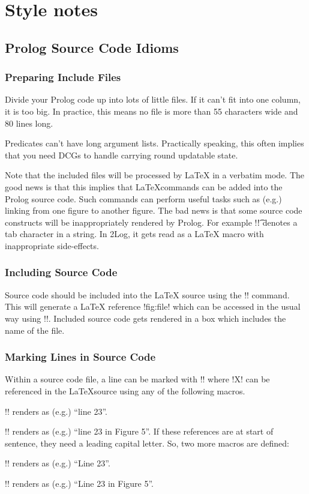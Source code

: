 \section{Style notes}

\subsection{Prolog Source Code Idioms}

\subsubsection{Preparing Include Files}

Divide your Prolog
code up into lots of little files. If it can't fit into one
column, it is too big. In practice, this means  no file is more than
55 characters wide and 80 lines long.

Predicates can't have long argument lists. Practically speaking, this
often implies that you need DCGs to handle carrying round updatable
state.

Note that the included files will be processed by \LaTeX
in a verbatim mode. The good news is that this
 implies that \LaTeX commands can be added
into the Prolog source code. Such commands can perform useful
tasks such as (e.g.) linking from one figure to another figure.
The bad news is that some source code constructs will be
inappropriately rendered by Prolog. For example !\t! denotes
 a tab character in a string. In \Text2Log,  it gets read as a \LaTeX
 macro with inappropriate side-effects.



\subsubsection{Including Source Code}

Source code should be included into the {\LaTeX} source using the
!! command. This will generate a {\LaTeX}
reference !fig:file! which can be accessed in the usual way using
!!. Included source code gets rendered in a box which
includes the name of the file.

\subsubsection{Marking Lines in Source Code}


Within a source code file,
a line can be marked with
!! where !X! can be
referenced in the \LaTeX source
using any of the following macros.
\bi
\item
!!
renders as  (e.g.) ``line  23''.
\item
!!
renders as  (e.g.) ``line  23 in Figure 5''.
\ei
If these references are at start of sentence, they need a leading
capital letter. So, two more macros are defined:
\bi
\item
!!
renders as  (e.g.) ``Line  23''.
\item
!!
renders as  (e.g.) ``Line  23 in Figure 5''.
\ei

